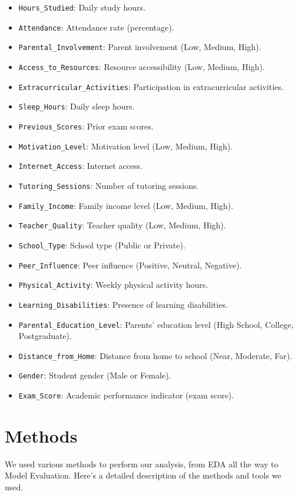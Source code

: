 \documentclass[twocolumn]{article} %
\begin{document}
\begin{itemize}
\item
  \texttt{Hours\_Studied}: Daily study hours.
\item
  \texttt{Attendance}: Attendance rate (percentage).
\item
  \texttt{Parental\_Involvement}: Parent involvement (Low, Medium, High).
\item
  \texttt{Access\_to\_Resources}: Resource accessibility (Low, Medium, High).
\item
  \texttt{Extracurricular\_Activities}: Participation in extracurricular
  activities.
\item
  \texttt{Sleep\_Hours}: Daily sleep hours.
\item
  \texttt{Previous\_Scores}: Prior exam scores.
\item
  \texttt{Motivation\_Level}: Motivation level (Low, Medium, High).
\item
  \texttt{Internet\_Access}: Internet access.
\item
  \texttt{Tutoring\_Sessions}: Number of tutoring sessions.
\item
  \texttt{Family\_Income}: Family income level (Low, Medium, High).
\item
  \texttt{Teacher\_Quality}: Teacher quality (Low, Medium, High).
\item
  \texttt{School\_Type}: School type (Public or Private).
\item
  \texttt{Peer\_Influence}: Peer influence (Positive, Neutral,
  Negative).
\item
  \texttt{Physical\_Activity}: Weekly physical activity hours.
\item
  \texttt{Learning\_Disabilities}: Presence of learning disabilities.
\item
  \texttt{Parental\_Education\_Level}: Parents' education level (High School, College, Postgraduate).
\item
  \texttt{Distance\_from\_Home}: Distance from home to school (Near, Moderate, Far).
\item
  \texttt{Gender}: Student gender (Male or Female).
\item
  \texttt{Exam\_Score}: Academic performance indicator (exam score).
\end{itemize}


\section{Methods}
We used various methods to perform our analysis, from EDA all the way to Model Evaluation. Here's a detailed description of the methods and tools we used.
\end{document}

